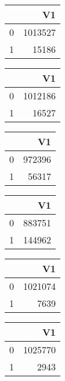 \bigskip\bigskip
\centering
\begin{tabular}{rr}
  \hline
 & V1 \\ 
  \hline
0 & 1013527 \\ 
  1 & 15186 \\ 
   \hline
\end{tabular}

\bigskip\bigskip
\centering
\begin{tabular}{rr}
  \hline
 & V1 \\ 
  \hline
0 & 1012186 \\ 
  1 & 16527 \\ 
   \hline
\end{tabular}

\bigskip\bigskip
\centering
\begin{tabular}{rr}
  \hline
 & V1 \\ 
  \hline
0 & 972396 \\ 
  1 & 56317 \\ 
   \hline
\end{tabular}

\bigskip\bigskip
\centering
\begin{tabular}{rr}
  \hline
 & V1 \\ 
  \hline
0 & 883751 \\ 
  1 & 144962 \\ 
   \hline
\end{tabular}

\bigskip\bigskip
\centering
\begin{tabular}{rr}
  \hline
 & V1 \\ 
  \hline
0 & 1021074 \\ 
  1 & 7639 \\ 
   \hline
\end{tabular}

\bigskip\bigskip
\centering
\begin{tabular}{rr}
  \hline
 & V1 \\ 
  \hline
0 & 1025770 \\ 
  1 & 2943 \\ 
   \hline
\end{tabular}

